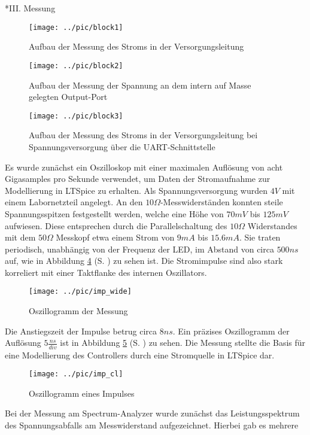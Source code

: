 \documentclass[a4paper,10pt, twocolumn]{article}
\begin{document}
\begin{section}*{III. Messung}
\begin{figure}[H]
  \texttt{[image: ../pic/block1]}
  \caption{Aufbau der Messung des Stroms in der Versorgungsleitung}
  \label{block1}
\end{figure}
\begin{figure}[H]
  \texttt{[image: ../pic/block2]}
  \caption{Aufbau der Messung der Spannung an dem intern auf Masse gelegten 
Output-Port}
  \label{block2}
\end{figure}
\begin{figure}[H]
  \texttt{[image: ../pic/block3]}
  \caption{Aufbau der Messung des Stroms in der Versorgungsleitung bei 
Spannungsversorgung über die UART-Schnittstelle}
  \label{block3}
\end{figure}
Es wurde zunächst ein Oszilloskop mit einer maximalen Auflösung von 
acht Gigasamples pro Sekunde verwendet, um Daten der Stromaufnahme zur 
Modellierung in LTSpice zu erhalten. Als Spannungsversorgung wurden $4V$ mit 
einem Labornetzteil angelegt. An den $10\Omega$-Messwiderständen konnten 
steile Spannungsspitzen festgestellt werden, welche eine Höhe von $70mV$ bis 
$125mV$ aufwiesen. Diese entsprechen durch die Parallelschaltung des 
$10\Omega{}$ Widerstandes mit dem $50\Omega$ Messkopf etwa einem Strom von 
$9mA$ bis $15.6mA$. Sie traten periodisch, unabhängig von der Frequenz der 
LED, im Abstand von circa $500ns$ auf, wie in Abbildung \ref{makro} (S. 
\pageref{makro}) zu sehen ist. Die Stromimpulse sind also stark 
korreliert mit einer Taktflanke des internen 
Oszillators. 
\begin{figure}
  \texttt{[image: ../pic/imp\_wide]}
  \caption{Oszillogramm der Messung}
  \label{makro}
\end{figure}
\newline
Die Anstiegszeit 
der Impulse betrug circa $8ns$. Ein präzises Oszillogramm der Auflösung 
$5\frac{ns}{div}$ ist in Abbildung \ref{mirko} 
(S. \pageref{mirko}) zu sehen. 
Die Messung stellte die Basis für eine Modellierung des Controllers durch eine 
Stromquelle in LTSpice dar.
\begin{figure}
  \texttt{[image: ../pic/imp\_cl]}
  \caption{Oszillogramm eines Impulses}
  \label{mirko}
\end{figure}
\newline\newline
Bei der Messung am Spectrum-Analyzer wurde zunächst das Leistungsspektrum 
des Spannungsabfalls am Messwiderstand aufgezeichnet. Hierbei gab es mehrere 

\end{section}
\end{document}
